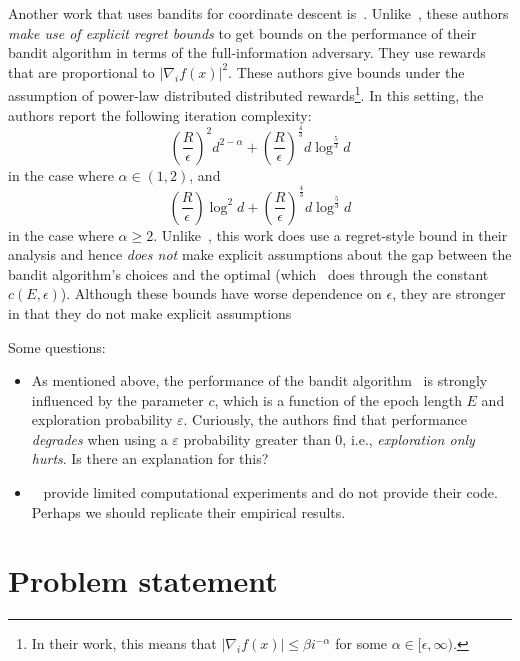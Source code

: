 \documentclass[letterpaper]{article}
\begin{document}
Another work that uses bandits for coordinate descent is~\cite{namkoong2017adaptive}. Unlike~\cite{salehi2018coordinate}, these authors \emph{make use of explicit regret bounds} to get bounds on the performance of their bandit algorithm in terms of the full-information adversary. They use rewards that are proportional to $|\nabla_i f(x)|^2$. These authors give bounds under the assumption of power-law distributed distributed rewards\footnote{In their work, this means that $|\nabla_i f(x)| \leq \beta i^{-\alpha}$ for some $\alpha \in [\epsilon, \infty)$.}. In this setting, the authors report the following iteration complexity:
\begin{equation}
    \left(\frac{R}{\epsilon}\right)^2 d^{2-\alpha} + \left(\frac{R}{\epsilon}\right)^\frac{4}{3} d \log^\frac{5}{3} d
\end{equation}
in the case where $\alpha \in (1,2)$, and
\begin{equation}
    \left(\frac{R}{\epsilon}\right) \log^2 d + \left(\frac{R}{\epsilon}\right)^\frac{4}{3} d \log^\frac{5}{3} d
\end{equation}
in the case where $\alpha \geq 2$. Unlike~\cite{salehi2018coordinate}, this work does use a regret-style bound in their analysis and hence \emph{does not} make explicit assumptions about the gap between the bandit algorithm's choices and the optimal (which~\cite{salehi2018coordinate} does through the constant $c(E, \epsilon)$). Although these bounds have worse dependence on $\epsilon$, they are stronger in that they do not make explicit assumptions 

Some questions:
\begin{itemize}
    \item As mentioned above, the performance of the bandit algorithm~\cite{salehi2018coordinate} is strongly influenced by the parameter $c$, which is a function of the epoch length $E$ and exploration probability $\varepsilon$. Curiously, the authors find that performance \emph{degrades} when using a $\varepsilon$ probability greater than 0, i.e., \emph{exploration only hurts}. Is there an explanation for this?
    \item ~\cite{salehi2018coordinate} provide limited computational experiments and do not provide their code. Perhaps we should replicate their empirical results.
\end{itemize}


\section{Problem statement}
\end{document}
